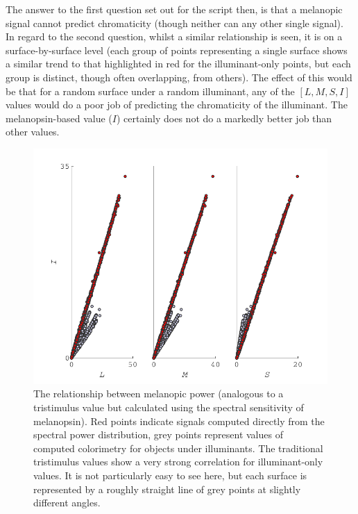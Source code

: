 The answer to the first question set out for the script then, is that a melanopic signal cannot predict chromaticity (though neither can any other single signal). In regard to the second question, whilst a similar relationship is seen, it is on a surface-by-surface level (each group of points representing a single surface shows a similar trend to that highlighted in red for the illuminant-only points, but each group is distinct, though often overlapping, from others). The effect of this would be that for a random surface under a random illuminant, any of the $[L,M,S,I]$ values would do a poor job of predicting the chromaticity of the illuminant. The melanopsin-based value ($I$) certainly does not do a markedly better job than other values.

\begin{figure}[htbp]
    \includegraphics[max width=\textwidth]{figs/comp/melcomp_1/correlationBetweenLevel1Sigs.pdf}
    \caption{The relationship between melanopic power (analogous to a tristimulus value but calculated using the spectral sensitivity of melanopsin). Red points indicate signals computed directly from the spectral power distribution, grey points represent values of computed colorimetry for objects under illuminants.  The traditional tristimulus values show a very strong correlation for illuminant-only values. It is not particularly easy to see here, but each surface is represented by a roughly straight line of grey points at slightly different angles.}
    \label{fig:tristimCorrelation}
\end{figure} 

